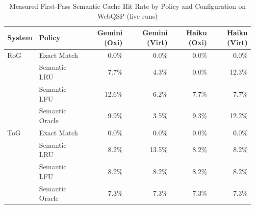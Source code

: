 \begin{table}[htbp]
\centering
\caption{Measured First-Pass Semantic Cache Hit Rate by Policy and Configuration on WebQSP (live runs)}
\label{tab:live_cache_hits_webqsp}
\begin{tabular}{llrrrr}
\hline
\textbf{System} & \textbf{Policy} & \textbf{Gemini (Oxi)} & \textbf{Gemini (Virt)} & \textbf{Haiku (Oxi)} & \textbf{Haiku (Virt)} \\
\hline
RoG  & Exact Match      & 0.0\% & 0.0\% & 0.0\% & 0.0\% \\
     & Semantic LRU     & 7.7\% & 4.3\% & 0.0\% & 12.3\% \\
     & Semantic LFU     & 12.6\% & 6.2\% & 7.7\% & 7.7\% \\
     & Semantic Oracle  & 9.9\% & 3.5\% & 9.3\% & 12.2\% \\
\hline
ToG  & Exact Match      & 0.0\% & 0.0\% & 0.0\% & 0.0\% \\
     & Semantic LRU     & 8.2\% & 13.5\% & 8.2\% & 8.2\% \\
     & Semantic LFU     & 8.2\% & 8.2\% & 8.2\% & 8.2\% \\
     & Semantic Oracle  & 7.3\% & 7.3\% & 7.3\% & 7.3\% \\
\hline
\end{tabular}
\end{table}
